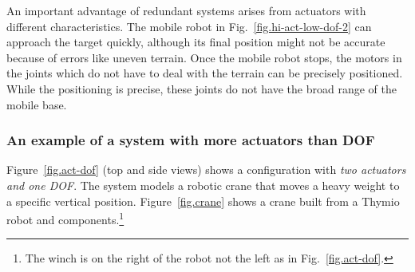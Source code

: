 An important advantage of redundant systems arises from actuators with different characteristics. The mobile robot in Fig.~\ref{fig.hi-act-low-dof-2} can approach the target quickly, although its final position might not be accurate because of errors like uneven terrain. Once the mobile robot stops, the motors in the joints which do not have to deal with the terrain can be precisely positioned. While the positioning is precise, these joints do not have the broad range of the mobile base.

\subsubsection*{An example of a system with more actuators than DOF}

Figure~\ref{fig.act-dof} (top and side views) shows a configuration with \emph{two actuators and one DOF}. The system models a robotic crane that moves a heavy weight to a specific vertical position. Figure~\ref{fig.crane} shows a crane built from a Thymio robot and \lego{} components.\footnote{The winch is on the right of the robot not the left as in Fig.~\ref{fig.act-dof}.}

